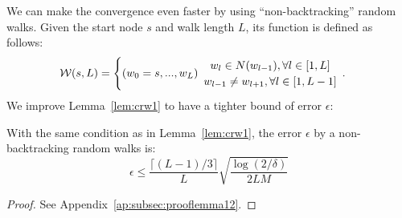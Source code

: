 We can make the convergence even faster
by using ``non-backtracking'' random walks.
Given the start node $s$ and walk length $L$, its function is defined as follows:
\begin{equation}
\mathcal{W}(s, L) = 
\begin{cases} (w_{0}=s, ..., w_{L}) \space 
\begin{array}{c}
w_{l} \in N{(w_{l-1})}, \forall l \in [1, L]
\\
w_{l-1} \neq w_{l+1}, \forall l\in [1, L-1]
\end{array}.
\end{cases}
\end{equation}
We improve Lemma~\ref{lem:crw1} to have a tighter bound of error $\epsilon$:
\begin{lemma}  \label{lem:crw2}
With the same condition as in Lemma~\ref{lem:crw1}, the error $\epsilon$ by a non-backtracking random walks is:
\begin{equation}
    \epsilon \leq \frac{\lceil (L - 1) / 3 \rceil}{L} \sqrt{\frac{\log{(2/\delta)}}{2LM}}
\end{equation}
\end{lemma}

\begin{proof}
See Appendix~\ref{ap:subsec:prooflemma12}.
\end{proof}


